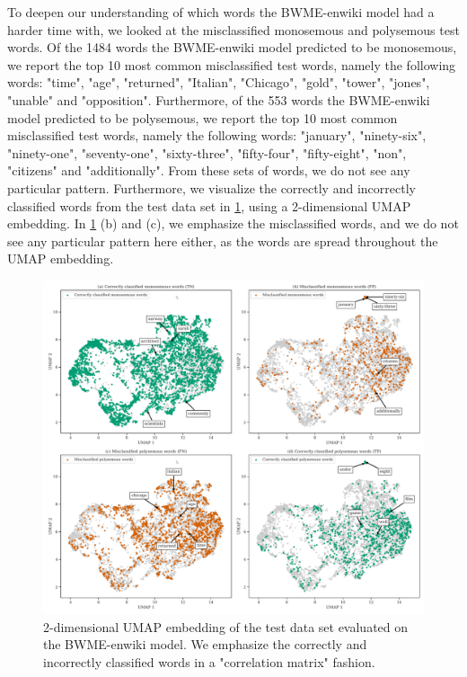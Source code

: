 To deepen our understanding of which words the BWME-enwiki model had a harder time with, we looked at the misclassified monosemous and polysemous test words. Of the 1484 words the BWME-enwiki model predicted to be monosemous, we report the top 10 most common misclassified test words, namely the following words: "time", "age", "returned", "Italian", "Chicago", "gold", "tower", "jones", "unable" and "opposition". Furthermore, of the 553 words the BWME-enwiki model predicted to be polysemous, we report the top 10 most common misclassified test words, namely the following words: "january", "ninety-six", "ninety-one", "seventy-one", "sixty-three", "fifty-four", "fifty-eight", "non", "citizens" and "additionally". From these sets of words, we do not see any particular pattern. Furthermore, we visualize the correctly and incorrectly classified words from the test data set in \cref{fig:bwme-enwiki-umap-classified-words}, using a 2-dimensional UMAP embedding. In \cref{fig:bwme-enwiki-umap-classified-words} (b) and (c), we emphasize the misclassified words, and we do not see any particular pattern here either, as the words are spread throughout the UMAP embedding.
\begin{figure}[H]
    \centering
    \includegraphics[width=\textwidth]{thesis/figures/bwme-enwiki-umap-classified-words.pdf}
    \caption{2-dimensional UMAP embedding of the test data set evaluated on the BWME-enwiki model. We emphasize the correctly and incorrectly classified words in a "correlation matrix" fashion.}
    \label{fig:bwme-enwiki-umap-classified-words}
\end{figure}

